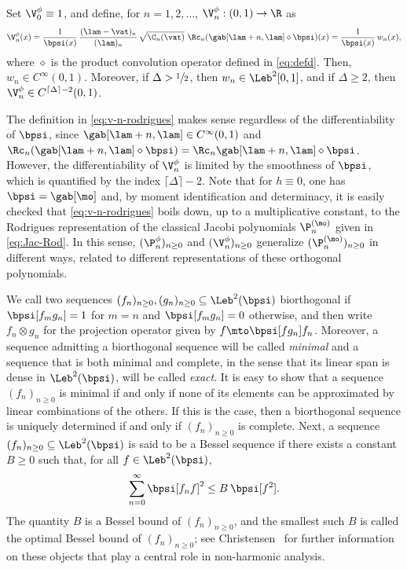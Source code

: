 \begin{proposition}
\label{prop:co-eigenfunctions}
Set $\V_0^\phi \equiv 1$, and define, for $n = 1,2,\ldots$, $\V_n^\phi: (0,1) \to \R$ as
\begin{equation}
\label{eq:v-n-rodrigues}
\V_n^\phi(x) = \frac{1}{\bpsi(x)}\, \frac{(\lam-\vat)_n}{(\lam)_n}\,\sqrt{\C_n(\vat)} \ \Rc_n (\gab[\lam+n,\lam] \diamond \bpsi) (x) = \frac{1}{\bpsi(x)}\,w_n(x),
\end{equation}
where $\diamond$ is the product convolution operator defined in \eqref{eq:defd}.
Then, $w_n \in C^\infty(0,1)$. Moreover, if $\Delta > \sfrac{1}{2}$, then $w_n \in \Leb^2[0,1]$, and if
$\Delta \geq 2$, then $\V_n^\phi \in C^{\lceil \Delta \rceil - 2}(0,1)$.
\end{proposition}

\begin{remark}
The definition in \eqref{eq:v-n-rodrigues} makes sense regardless of the differentiability of $\bpsi$, since $\gab[\lam+n,\lam] \in C^\infty(0,1)$ and $\Rc_n (\gab[\lam+n,\lam] \diamond \bpsi) = \Rc_n \gab[\lam+n,\lam] \diamond \bpsi$. However, the differentiability of $\V_n^\phi$ is limited by the smoothness of $\bpsi$, which is quantified by the index $\lceil \Delta \rceil - 2$. Note that for $h \equiv 0$, one has $\bpsi = \gab[\mo]$ and, by moment identification and determinacy, it is easily checked that \eqref{eq:v-n-rodrigues} boils down, up to a multiplicative constant, to the Rodrigues representation of the classical Jacobi polynomials $\P_n^{(\mo)}$ given in \eqref{eq:Jac-Rod}. In this sense, $(\P_n^\phi)_{n \geq 0}$ and $(\V_n^\phi)_{n \geq 0}$ generalize $(\P_n^{(\mo)})_{n \geq 0}$ in different ways, related to different representations of these orthogonal polynomials.
\end{remark}

We call two sequences $(f_n)_{n \geq 0}, (g_n)_{n \geq 0} \subseteq \Leb^2(\bpsi)$ biorthogonal if $\bpsi [ f_mg_n ] = 1$ for
$m=n$ and $\bpsi [f_mg_n] = 0$ otherwise, and then write $f_n \otimes g_n$ for the projection operator given by $f \mto \bpsi[f g_n] f_n$. Moreover, a sequence admitting a biorthogonal sequence will be called \emph{minimal} and a sequence that is both minimal and complete, in the sense that its linear span is dense in $\Leb^2(\bpsi)$,
will be called \emph{exact}. It is easy to show that a sequence $(f_n)_{n \geq 0}$ is minimal if and only if none of
its elements can be approximated by linear combinations of the others. If this is the case, then
a biorthogonal sequence is uniquely determined if and only if $(f_n)_{n \geq 0}$ is complete.
Next, a sequence $(f_n)_{n \geq 0} \subseteq \Leb^2(\bpsi)$ is said to be a Bessel sequence if there exists
a constant $B \ge 0$ such that, for all $f \in \Leb^2(\bpsi)$,
\begin{equation*}
\sum_{n=0}^\infty \bpsi [f_n f]^2 \leq B \: \bpsi[f^2].
\end{equation*}
The quantity $B$ is a Bessel bound of $(f_n)_{n \geq 0}$, and the smallest such $B$ is called the optimal Bessel bound of $(f_n)_{n \geq 0}$; see \eg Christensen~\cite{Christensen2003a} for further information on these objects that play a central role in non-harmonic analysis.

